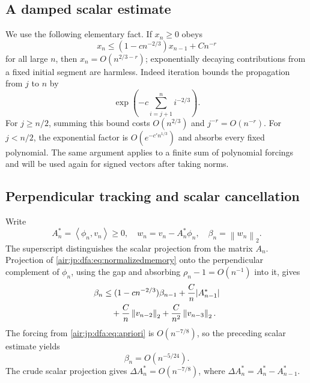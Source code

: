 \documentclass[11pt,letterpaper]{article}
\numberwithin{equation}{section}
\theoremstyle{remark}
\newcommand{\ip}[2]{\left\langle#1,#2\right\rangle}
\newcommand{\normtwo}[1]{\left\lVert#1\right\rVert_2}
\begin{document}
\subsection{A damped scalar estimate}
We use the following elementary fact. If $x_n\ge0$ obeys
\[
 x_n\le(1-cn^{-2/3})x_{n-1}+Cn^{-r}
\]
for all large $n$, then $x_n=O(n^{2/3-r})$; exponentially decaying contributions from a fixed initial segment are harmless. Indeed iteration bounds the propagation from $j$ to $n$ by
\[
 \exp\left(-c\sum_{i=j+1}^n i^{-2/3}\right).
\]
For $j\ge n/2$, summing this bound costs $O(n^{2/3})$ and $j^{-r}=O(n^{-r})$. For $j<n/2$, the exponential factor is $O(e^{-c'n^{1/3}})$ and absorbs every fixed polynomial. The same argument applies to a finite sum of polynomial forcings and will be used again for signed vectors after taking norms.

\subsection{Perpendicular tracking and scalar cancellation}
Write
\[
 A_n^*=\ip{\phi_n}{v_n}\ge0,\quad w_n=v_n-A_n^*\phi_n,
 \quad\beta_n=\normtwo{w_n}.
\]
The superscript distinguishes the scalar projection from the matrix $A_n$. Projection of \eqref{air:jp:dfa:eq:normalizedmemory} onto the perpendicular complement of $\phi_n$, using the gap and absorbing $\rho_n-1=O(n^{-1})$ into it, gives
\begin{align}
 \beta_n&\le(1-cn^{-2/3})\beta_{n-1}+\frac Cn|A_{n-1}^*|\notag\\
 &\quad+\frac Cn\normtwo{v_{n-2}}+\frac C{n^2}\normtwo{v_{n-3}}.\label{air:jp:dfa:eq:perp}
\end{align}
The forcing from \eqref{air:jp:dfa:eq:apriori} is $O(n^{-7/8})$, so the preceding scalar estimate yields
\begin{equation}\label{air:jp:dfa:eq:weakperp}
 \beta_n=O(n^{-5/24}).
\end{equation}
The crude scalar projection gives $\Delta A_n^*=O(n^{-7/8})$, where $\Delta A_n^*=A_n^*-A_{n-1}^*$.
\end{document}
